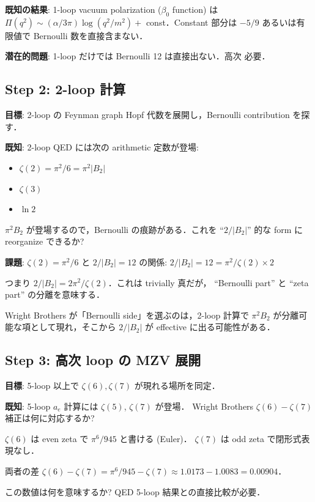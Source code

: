 \documentclass[11pt,a4paper]{article}
\begin{document}
\textbf{既知の結果}: 1-loop vacuum polarization ($\beta_0$ function) は
$\Pi(q^2) \sim (\alpha/3\pi) \log(q^2/m^2) + $ const．Constant 部分は
$-5/9$ あるいは有限値で Bernoulli 数を直接含まない．

\textbf{潜在的問題}: 1-loop だけでは Bernoulli 12 は直接出ない．高次
必要．

\subsection{Step 2: 2-loop 計算}

\textbf{目標}: 2-loop の Feynman graph Hopf 代数を展開し，Bernoulli
contribution を探す．

\textbf{既知}: 2-loop QED には次の arithmetic 定数が登場:
\begin{itemize}
\item $\zeta(2) = \pi^2/6 = \pi^2 |B_2|$
\item $\zeta(3)$
\item $\ln 2$
\end{itemize}

$\pi^2 B_2$ が登場するので，Bernoulli の痕跡がある．これを ``$2/|B_2|$''
的な form に reorganize できるか?

\textbf{課題}: $\zeta(2) = \pi^2/6$ と $2/|B_2| = 12$ の関係:
$2/|B_2| = 12 = \pi^2/\zeta(2) \times 2$

つまり $2/|B_2| = 2\pi^2/\zeta(2)$．これは trivially 真だが，
``Bernoulli part'' と ``zeta part'' の分離を意味する．

Wright Brothers が「Bernoulli side」を選ぶのは，2-loop 計算で
$\pi^2 B_2$ が分離可能な項として現れ，そこから $2/|B_2|$ が
effective に出る可能性がある．

\subsection{Step 3: 高次 loop の MZV 展開}

\textbf{目標}: 5-loop 以上で $\zeta(6), \zeta(7)$ が現れる場所を同定．

\textbf{既知}: 5-loop $a_e$ 計算には $\zeta(5)$, $\zeta(7)$ が登場．
Wright Brothers $\zeta(6) - \zeta(7)$ 補正は何に対応するか?

$\zeta(6)$ は even zeta で $\pi^6/945$ と書ける (Euler)．
$\zeta(7)$ は odd zeta で閉形式表現なし．

両者の差 $\zeta(6) - \zeta(7) = \pi^6/945 - \zeta(7) \approx 1.0173 - 1.0083 = 0.00904$．

この数値は何を意味するか? QED 5-loop 結果との直接比較が必要．
\end{document}
